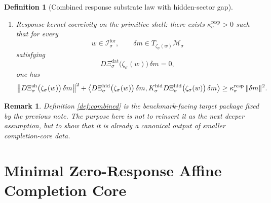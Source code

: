 \documentclass[11pt]{article}
\newcommand{\ForSpace}[1]{\mathcal I_{#1}^{\mathrm{for}}}
\newcommand{\DataSpace}[1]{\mathcal Y_{#1}^{\mathrm{obs}}}
\newcommand{\ProtoSpace}[1]{\mathcal M_{#1}}
\newcommand{\ResponseData}[1]{\Xi_{#1}^{\mathrm{dat}}}
\newcommand{\ResponseShell}[1]{\Xi_{#1}^{\mathrm{sh}}}
\newcommand{\ResponseHidden}[1]{\Xi_{#1}^{\mathrm{hid}}}
\newcommand{\ResponseImage}[1]{\mathcal B_{#1}^{\mathrm{resp}}}
\newcommand{\HiddenOperator}[1]{K_{#1}^{\mathrm{hid}}}
\newcommand{\ProtoEmbed}[1]{\zeta_{#1}}
\newtheorem{definition}{Definition}
\newtheorem{remark}{Remark}
\begin{document}
\begin{definition}[Combined response substrate law with hidden-sector gap]
\begin{enumerate}
\begin{equation}
    =
    \operatorname{pr}_{\DataSpace{\sigma}}
    \Bigl(
    \ResponseImage{\sigma}\cap
    \bigl(
    \DataSpace{\sigma}\oplus\{0\}\oplus\{0\}
    \bigr)
    \Bigr).
    \label{eq:combinedsolvability}
    \end{equation}
    \item Response-kernel coercivity on the primitive shell: there exists \(\kappa_{\sigma}^{\mathrm{resp}}>0\) such that for every
    \[
    w\in\ForSpace{\sigma},
    \qquad
    \delta m\in T_{\ProtoEmbed{\sigma}(w)}\ProtoSpace{\sigma}
    \]
    satisfying
    \[
    D\ResponseData{\sigma}\bigl(\ProtoEmbed{\sigma}(w)\bigr)\,\delta m=0,
    \]
    one has
    \begin{equation}
    \bigl\|
    D\ResponseShell{\sigma}\bigl(\ProtoEmbed{\sigma}(w)\bigr)\,\delta m
    \bigr\|^{2}
    +
    \ev{
    D\ResponseHidden{\sigma}\bigl(\ProtoEmbed{\sigma}(w)\bigr)\,\delta m,
    \HiddenOperator{\sigma}
    D\ResponseHidden{\sigma}\bigl(\ProtoEmbed{\sigma}(w)\bigr)\,\delta m
    }
    \ge
    \kappa_{\sigma}^{\mathrm{resp}}\,
    \|\delta m\|^{2}.
    \label{eq:combinedcoercive}
    \end{equation}
\end{enumerate}
\end{definition}

\begin{remark}
Definition \ref{def:combined} is the benchmark-facing target package fixed by the previous note. The purpose here is not to reinsert it as the next deeper assumption, but to show that it is already a canonical output of smaller completion-core data.
\end{remark}

\section{Minimal Zero-Response Affine Completion Core}
\end{document}
